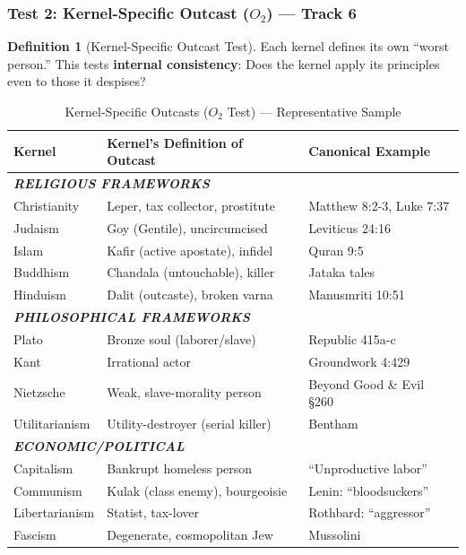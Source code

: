 \documentclass[11pt,a4paper]{article}
\theoremstyle{definition}
\newtheorem{definition}[theorem]{Definition}
\theoremstyle{remark}
\begin{document}
\subsubsection{Test 2: Kernel-Specific Outcast ($O_2$) --- Track 6}

\begin{definition}[Kernel-Specific Outcast Test]
\label{def:kernel-outcast}
Each kernel defines its own ``worst person.'' This tests \textbf{internal consistency}: Does the kernel apply its principles even to those it despises?
\end{definition}

\begin{table}[H]
\centering
\caption{Kernel-Specific Outcasts ($O_2$ Test) --- Representative Sample}
\label{tab:kernel-outcasts}
\begin{tabular}{@{}lll@{}}
\toprule
\textbf{Kernel} & \textbf{Kernel's Definition of Outcast} & \textbf{Canonical Example} \\
\midrule
\multicolumn{3}{l}{\textit{\textbf{RELIGIOUS FRAMEWORKS}}} \\
Christianity & Leper, tax collector, prostitute & Matthew 8:2-3, Luke 7:37 \\
Judaism & Goy (Gentile), uncircumcised & Leviticus 24:16 \\
Islam & Kafir (active apostate), infidel & Quran 9:5 \\
Buddhism & Chandala (untouchable), killer & Jataka tales \\
Hinduism & Dalit (outcaste), broken varna & Manusmriti 10:51 \\
\midrule
\multicolumn{3}{l}{\textit{\textbf{PHILOSOPHICAL FRAMEWORKS}}} \\
Plato & Bronze soul (laborer/slave) & Republic 415a-c \\
Kant & Irrational actor & Groundwork 4:429 \\
Nietzsche & Weak, slave-morality person & Beyond Good \& Evil §260 \\
Utilitarianism & Utility-destroyer (serial killer) & Bentham \\
\midrule
\multicolumn{3}{l}{\textit{\textbf{ECONOMIC/POLITICAL}}} \\
Capitalism & Bankrupt homeless person & ``Unproductive labor'' \\
Communism & Kulak (class enemy), bourgeoisie & Lenin: ``bloodsuckers'' \\
Libertarianism & Statist, tax-lover & Rothbard: ``aggressor'' \\
Fascism & Degenerate, cosmopolitan Jew & Mussolini \\

\end{tabular}
\end{table}
\end{document}

